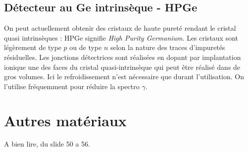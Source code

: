 \subsection{Détecteur au Ge intrinsèque - HPGe}
On peut actuellement obtenir des cristaux de haute pureté rendant le cristal quasi intrinsèques
: HPGe signifie \textit{High Purity Germanium}. Les cristaux sont légèrement de type $p$ ou de type $n
$ selon la nature des traces d'impuretés résiduelles. Les jonctions détectrices sont réalisées en 
dopant par implantation ionique une des faces du cristal quasi-intrinsèque qui peut être réalisé dans 
de gros volumes. Ici le refroidissement n'est nécessaire que durant l'utilisation. On l'utilise
fréquemment pour réduire la spectro $\gamma$.





































\section{Autres matériaux}%
A bien lire, du slide 50 a 56.